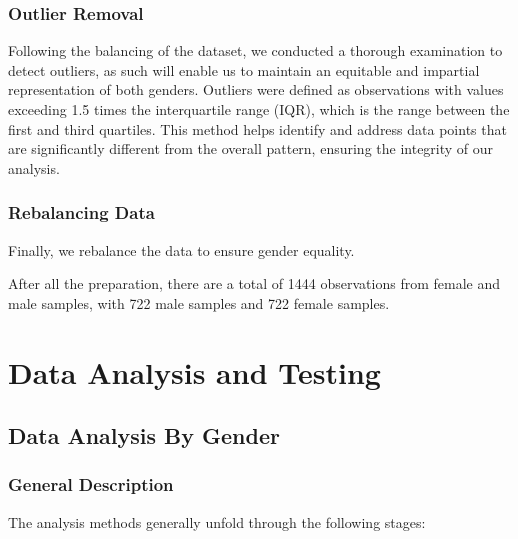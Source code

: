 \documentclass{article}
\begin{document}
	\subsubsection{Outlier Removal}
	
	Following the balancing of the dataset, we conducted a thorough examination to detect outliers, as such will enable us to maintain an equitable and impartial representation of both genders. Outliers were defined as observations with values exceeding 1.5 times the interquartile range (IQR), which is the range between the first and third quartiles. This method helps identify and address data points that are significantly different from the overall pattern, ensuring the integrity of our analysis.
	
	\subsubsection{Rebalancing Data}
	
	Finally, we rebalance the data to ensure gender equality.
	
	After all the preparation, there are a total of 1444 observations from female and male samples, with 722 male samples and 722 female samples.
	
	\section{Data Analysis and Testing}
	
	\subsection{Data Analysis By Gender}
	
	\subsubsection{General Description}
	
	The analysis methods generally unfold through the following stages:
	
\end{document}

